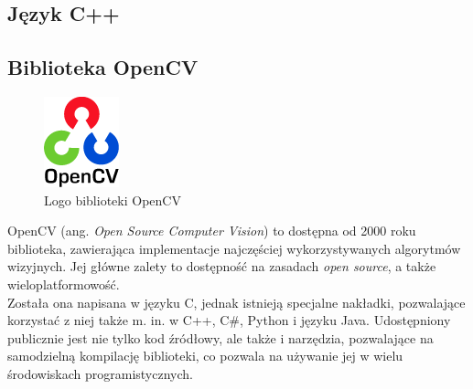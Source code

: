 \subsection{Język C++}
\subsection{Biblioteka OpenCV}
\begin{figure}[!htb]
\centering

\includegraphics[width=82px]{img/ocv_logo}
\caption{Logo biblioteki OpenCV \cite{OpenCVLogo}}
\end{figure}
OpenCV (ang. \textit{Open Source Computer Vision}) to dostępna od 2000 roku biblioteka, zawierająca implementacje najczęściej wykorzystywanych algorytmów wizyjnych. Jej główne zalety to dostępność na zasadach \textit{open source}, a także wieloplatformowość.\\
Została ona napisana w języku C, jednak istnieją specjalne nakładki, pozwalające korzystać z niej także m. in. w C++, C\#, Python i języku Java. Udostępniony publicznie jest nie tylko kod źródłowy, ale także i narzędzia, pozwalające na samodzielną kompilację biblioteki, co pozwala na używanie jej w wielu środowiskach programistycznych.
